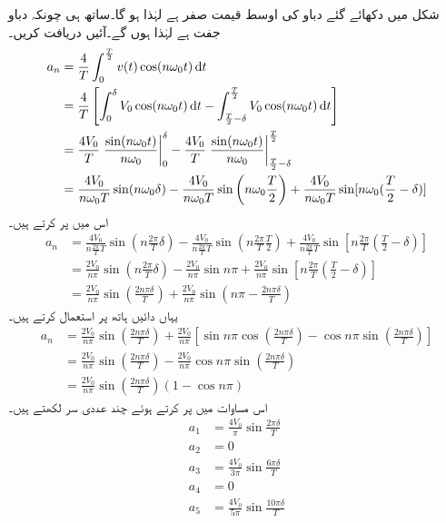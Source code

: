 شکل میں دکھائے گئے دباو کی اوسط قیمت صفر ہے لہٰذا  ہو گا۔ساتھ ہی چونکہ دباو جفت ہے لہٰذا  ہوں گے۔آئیں  دریافت کریں۔
\begin{align*}
a_n&=\frac{4}{T}\int_0^{\frac{T}{2}} v(t)\cos (n\omega_0 t)\dif t\\
&=\frac{4}{T}\left[\int_0^{\delta} V_0\cos(n\omega_0 t) \dif t-\int_{\frac{T}{2}-\delta}^{\frac{T}{2}}V_0 \cos(n\omega_0 t)\dif t\right]\\
&=\frac{4V_0}{T}\left. \frac{\sin(n\omega_0 t)}{n\omega_0}\right|_{0}^{\delta}-\frac{4V_0}{T}\left. \frac{\sin(n\omega_0 t)}{n\omega_0}\right|_{\frac{T}{2}-\delta}^{\frac{T}{2}}\\
&=\frac{4V_0}{n\omega_0 T}\sin(n\omega_0 \delta)-\frac{4V_0}{n\omega_0 T}\sin\left(n\omega_0 \frac{T}{2}\right)+\frac{4V_0}{n\omega_0 T}\sin[n\omega_0 (\frac{T}{2}-\delta)]
\end{align*}
اس میں  پر کرتے ہیں۔
\begin{align*}
a_n&=\frac{4V_0}{n\frac{2\pi}{T} T}\sin(n\frac{2\pi}{T}\delta)-\frac{4V_0}{n\frac{2\pi}{T} T}\sin\left(n\frac{2\pi}{T} \frac{T}{2}\right)+\frac{4V_0}{n\frac{2\pi}{T} T}\sin[n\frac{2\pi}{T} (\frac{T}{2}-\delta)]\\
&=\frac{2V_0}{n\pi}\sin(n\frac{2\pi}{T}\delta)-\frac{2V_0}{n\pi}\sin n\pi+\frac{2V_0}{n\pi}\sin[n\frac{2\pi}{T} (\frac{T}{2}-\delta)]\\
&=\frac{2V_0}{n\pi}\sin\left(\frac{2n\pi\delta}{T}\right)+\frac{2V_0}{n\pi}\sin\left(n\pi-\frac{2n\pi\delta}{T}\right)
\end{align*}
یہاں دائیں ہاتھ پر  استعمال کرتے ہیں۔
\begin{align*}
a_n&=\frac{2V_0}{n\pi}\sin\left(\frac{2n\pi\delta}{T}\right)+\frac{2V_0}{n\pi}\left[\sin n\pi \cos(\frac{2n\pi\delta}{T})-\cos n\pi \sin(\frac{2n\pi\delta}{T})\right]\\
&=\frac{2V_0}{n\pi}\sin\left(\frac{2n\pi\delta}{T}\right)-\frac{2V_0}{n\pi}\cos n\pi \sin(\frac{2n\pi\delta}{T})\\
&=\frac{2V_0}{n\pi}\sin\left(\frac{2n\pi\delta}{T}\right)(1-\cos n\pi)
\end{align*}
اس مساوات میں  پر کرتے ہوئے چند عددی سر لکھتے ہیں۔
\begin{align*}
a_1&=\frac{4V_0}{\pi}\sin\frac{2\pi\delta}{T}\\
a_2&=0\\
a_3&=\frac{4V_0}{3\pi}\sin\frac{6\pi\delta}{T}\\
a_4&=0\\
a_5&=\frac{4V_0}{5\pi}\sin\frac{10\pi\delta}{T}
\end{align*}
